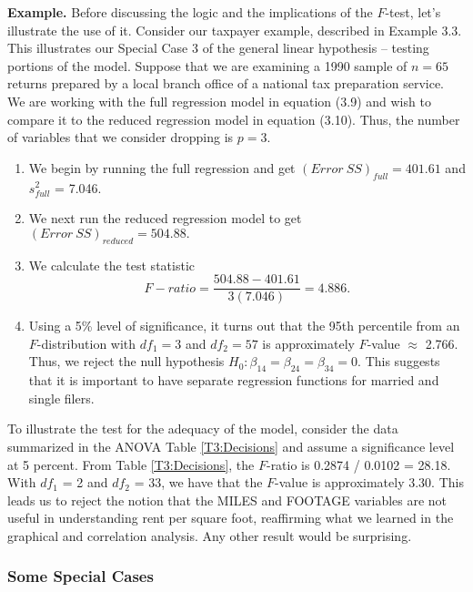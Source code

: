 \linejed

\textbf{Example.} Before discussing the logic and the implications
of the $F$-test, let's illustrate the use of it. Consider our
taxpayer example, described in Example 3.3. This illustrates our
Special Case 3 of the general linear hypothesis -- testing portions
of the model. Suppose that we are examining a 1990 sample of $n=65$
returns prepared by a local branch office of a national tax
preparation service. We are working with the full regression model
in equation (3.9) and wish to compare it to the reduced regression
model in equation (3.10). Thus, the number of variables that we
consider dropping is $p=3$.

\begin{enumerate}
\item We begin by running the full regression and get $%
(Error~SS)_{full}=401.61$ and $s_{full}^{2}$ = 7.046.

\item We next run the reduced regression model to get $%
(Error~SS)_{reduced}=504.88.$

\item We calculate the test statistic
\begin{equation*}
F-ratio=\frac{504.88-401.61}{3(7.046)}=4.886.
\end{equation*}

\item Using a 5\% level of significance, it turns out that the 95th
percentile from an $F$-distribution with $df_{1}=3$ and $df_{2}=57$
is approximately $F$-value $\approx $ 2.766. Thus, we reject the
null hypothesis $H_{0}:\beta _{14}=\beta _{24}=\beta _{34}=0$. This
suggests that it is important to have separate regression functions
for married and single filers.
\end{enumerate}

To illustrate the test for the adequacy of the model, consider the
data summarized in the ANOVA Table \ref{T3:Decisions} and assume a
significance level at 5 percent. From Table \ref{T3:Decisions}, the
$F$-ratio is 0.2874 / 0.0102 = 28.18. With $df_1$ = 2 and $df_2$ =
33, we have that the $F$-value is approximately 3.30. This leads us
to reject the notion that the MILES and FOOTAGE variables are not
useful in understanding rent per square foot, reaffirming what we
learned in the graphical and correlation analysis. Any other result
would be surprising.

\linejed

\subsubsection*{Some Special Cases}

